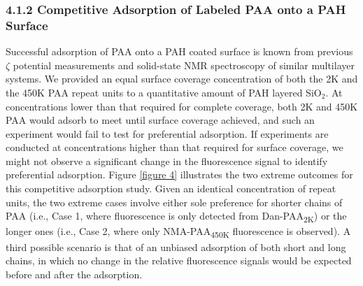 \documentclass[journal=mamobx,manuscript=article]{achemso}
\begin{document}
\subsubsection{4.1.2 Competitive Adsorption of Labeled PAA onto a PAH Surface}

Successful adsorption of PAA onto a PAH coated surface is known from previous $\zeta$ potential measurements and solid-state NMR spectroscopy of similar multilayer systems.\cite{Burke2003,Smith2004}  We provided an equal surface coverage concentration of both the 2K and the 450K PAA repeat units to a quantitative amount of PAH layered SiO$_2$.  At concentrations lower than that required for complete coverage, both 2K and 450K PAA would adsorb to meet until surface coverage achieved, and such an experiment would fail to test for preferential adsorption.  If experiments are conducted at concentrations higher than that required for surface coverage, we might not observe a significant change in the 
fluorescence signal to identify preferential adsorption. Figure \ref{figure 4} illustrates the two extreme outcomes for this competitive adsorption study.  Given an identical concentration of repeat units, the two extreme cases involve either sole preference for shorter chains of PAA (i.e., Case 1, where fluorescence is only detected from Dan-PAA\textsubscript{2K}) or the longer ones (i.e., Case 2, where only NMA-PAA\textsubscript{450K} fluorescence is observed).  A third possible scenario is that of an unbiased adsorption of both short and long chains, in which no change in the relative fluorescence signals would be expected before and after the adsorption. 
\end{document}

